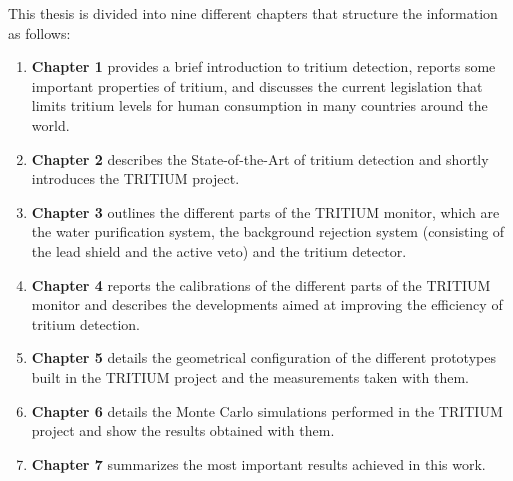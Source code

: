 This thesis is divided into nine different chapters that structure the information as follows:

\begin{enumerate}
\item{} \textbf{Chapter 1} provides a brief introduction to tritium detection, reports some important properties of tritium, and discusses the current legislation that limits tritium levels for human consumption in many countries around the world. 

\item{} \textbf{Chapter 2} describes the State-of-the-Art of tritium detection and shortly introduces the TRITIUM project. 

\item{} \textbf{Chapter 3} outlines the different parts of the TRITIUM monitor, which are the water purification system, the background rejection system (consisting of the lead shield and the active veto)  and the tritium detector. 

\item{} \textbf{Chapter 4} reports the calibrations of the different parts of the TRITIUM monitor and describes the developments aimed at improving the efficiency of tritium detection. 

\item{} \textbf{Chapter 5} details the geometrical configuration of the different prototypes built in the TRITIUM project and the measurements taken with them. 

\item{} \textbf{Chapter 6} details the Monte Carlo simulations performed in the TRITIUM project and show the results obtained with them. 

\item{} \textbf{Chapter 7} summarizes the most important results achieved in this work.

\end{enumerate}


